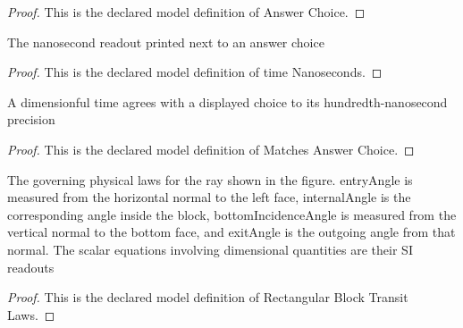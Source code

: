 \begin{proof}
  This is the declared model definition of Answer Choice.
\end{proof}
\begin{definition}
  \label{def:physics:phyx-mini-0023:phyxminiproblems-problemphyxmini0023-answerchoice-timenanoseconds}
  The nanosecond readout printed next to an answer choice
\end{definition}
\begin{proof}
  This is the declared model definition of time Nanoseconds.
\end{proof}
\begin{definition}
  \label{def:physics:phyx-mini-0023:phyxminiproblems-problemphyxmini0023-matchesanswerchoice}
  A dimensionful time agrees with a displayed choice to its hundredth-nanosecond precision
\end{definition}
\begin{proof}
  This is the declared model definition of Matches Answer Choice.
\end{proof}
\begin{definition}
  \label{def:physics:phyx-mini-0023:phyxminiproblems-problemphyxmini0023-rectangularblocktransitlaws}
  The governing physical laws for the ray shown in the figure. entryAngle is measured from the horizontal normal to the left face, internalAngle is the corresponding angle inside the block, bottomIncidenceAngle is measured from the vertical normal to the bottom face, and exitAngle is the outgoing angle from that normal. The scalar equations involving dimensional quantities are their SI readouts
\end{definition}
\begin{proof}
  This is the declared model definition of Rectangular Block Transit Laws.
\end{proof}
